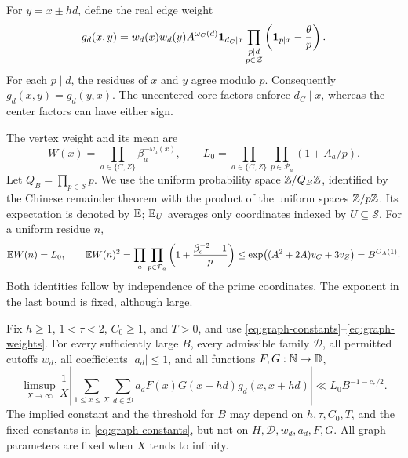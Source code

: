For $y=x\pm hd$, define the real edge weight
\begin{equation}\label{eq:graph-kernel}
 g_d(x,y)=w_d(x)w_d(y)A^{\omega_C(d)}\mathbf 1_{d_C\mid x}
       \prod_{\substack{p\mid d\\p\in\mathcal Z}}
             \left(\mathbf 1_{p\mid x}-\frac\theta p\right).
\end{equation}
For each $p\mid d$, the residues of $x$ and $y$ agree modulo $p$.
Consequently $g_d(x,y)=g_d(y,x)$. The uncentered core factors enforce
$d_C\mid x$, whereas the center factors can have either sign.

The vertex weight and its mean are
\begin{equation}\label{eq:graph-weights}
 W(x)=\prod_{a\in\{C,Z\}}\beta_a^{-\omega_a(x)},\qquad
 L_0=\prod_{a\in\{C,Z\}}\prod_{p\in\mathcal P_a}(1+A_a/p).
\end{equation}
Let $Q_B=\prod_{p\in\mathcal S}p$. We use the uniform probability space
$\mathbb Z/Q_B\mathbb Z$, identified by the Chinese remainder theorem with the product
of the uniform spaces $\mathbb Z/p\mathbb Z$. Its expectation is denoted by $\mathbb E$;
$\mathbb E_U$ averages only coordinates indexed by $U\subseteq\mathcal S$.
For a uniform residue $n$,
\begin{equation}\label{eq:weight-moments}
 \mathbb E W(n)=L_0,\qquad
 \mathbb E W(n)^2
 =\prod_a\prod_{p\in\mathcal P_a}
        \left(1+\frac{\beta_a^{-2}-1}{p}\right)
 \le \exp\bigl((A^2+2A)v_C+3v_Z\bigr)=B^{O_A(1)}.
\end{equation}
Both identities follow by independence of the prime coordinates.
The exponent in the last bound is fixed, although large.

\begin{proposition}\label{prop:graph-estimate}
Fix $h\ge1$, $1<\tau<2$, $C_0\ge1$, and $T>0$, and use
\eqref{eq:graph-constants}--\eqref{eq:graph-weights}. For every sufficiently
large $B$, every admissible family $\mathcal D$, all permitted cutoffs
$w_d$, all coefficients $|a_d|\le1$, and all functions
$F,G:\mathbb N\to\mathbb D$,
\begin{equation}\label{eq:graph-estimate}
 \limsup_{X\to\infty}\frac1X
 \left|\sum_{1\le x\le X}\sum_{d\in\mathcal D}
 a_dF(x)G(x+hd)g_d(x,x+hd)\right|
 \ll L_0 B^{-1-c_*/2}.
\end{equation}
The implied constant and the threshold for $B$ may depend on
$h,\tau,C_0,T$, and the fixed constants in \eqref{eq:graph-constants},
but not on $H,\mathcal D,w_d,a_d,F,G$. All graph parameters are fixed
when $X$ tends to infinity.
\end{proposition}

